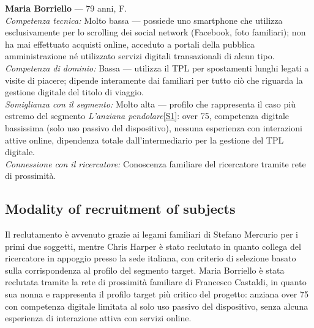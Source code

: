 \documentclass[11pt,a4paper]{article}
\begin{document}
\begin{tcolorbox}[colback=backgroundColor,colframe=borderColor,arc=2mm]
\vspace{0.2cm}

\textbf{Maria Borriello} --- 79 anni, F.\\[0.3cm]
\textit{Competenza tecnica:} Molto bassa --- possiede uno
smartphone che utilizza esclusivamente per lo scrolling dei
social network (Facebook, foto familiari); non ha mai
effettuato acquisti online, acceduto a portali della
pubblica amministrazione né utilizzato servizi digitali
transazionali di alcun tipo.\\[0.2cm]
\textit{Competenza di dominio:} Bassa  --- utilizza il TPL
per spostamenti lunghi legati a visite di piacere; dipende interamente dai familiari per tutto ciò
che riguarda la gestione digitale del titolo di viaggio.\\[0.2cm]
\textit{Somiglianza con il segmento:} Molto alta --- profilo
che rappresenta il caso più estremo del segmento
\textit{L'anziana pendolare}\hyperref[seg:anziana]{[S1]}: over 75, competenza digitale
bassissima (solo uso passivo del dispositivo), nessuna
esperienza con interazioni attive online, dipendenza totale
dall'intermediario per la gestione del TPL digitale.\\[0.2cm]
\textit{Connessione con il ricercatore:} Conoscenza familiare
del ricercatore tramite rete di prossimità.

\end{tcolorbox}

\vspace{0.2cm}
\subsection*{Modality of recruitment of subjects}
\begin{tcolorbox}[colback=backgroundColor,colframe=borderColor,arc=2mm]
Il reclutamento è avvenuto grazie ai legami familiari di Stefano Mercurio per i primi due soggetti, mentre Chris Harper è stato reclutato in quanto collega del ricercatore in appoggio presso la sede italiana, con criterio di selezione basato sulla corrispondenza al profilo del segmento target. Maria Borriello è stata reclutata tramite la rete di prossimità familiare di Francesco Castaldi, in quanto sua nonna e rappresenta il profilo target più critico del progetto: anziana over 75 con competenza digitale limitata al solo uso passivo del dispositivo, senza alcuna esperienza di interazione attiva con servizi online.
\end{tcolorbox}
\vspace{0.2cm}
\end{document}
